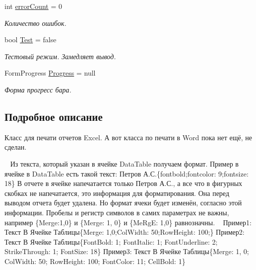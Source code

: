 \begin{DoxyCompactItemize}
int \mbox{\hyperlink{class_f_b_a_1_1_sys_report_x_l_s_x_a2a99d383eca41e9032454ca07cec6f4f}{error\+Count}} = 0
\begin{DoxyCompactList}\small\item\em Количество ошибок. \end{DoxyCompactList}\item 
bool \mbox{\hyperlink{class_f_b_a_1_1_sys_report_x_l_s_x_a738ec4b2907ead0a77b3c9ce3c212d1a}{Test}} = false
\begin{DoxyCompactList}\small\item\em Тестовый режим. Замедляет вывод. \end{DoxyCompactList}\item 
Form\+Progress \mbox{\hyperlink{class_f_b_a_1_1_sys_report_x_l_s_x_aaff45cfd52ba21dba901b47b7beb0ce7}{Progress}} = null
\begin{DoxyCompactList}\small\item\em Форма прогресс бара. \end{DoxyCompactList}\end{DoxyCompactItemize}


\subsection{Подробное описание}
Класс для печати отчетов Excel. А вот класса по печати в Word пока нет ещё, не сделан. 

~\newline
Из текста, который указан в ячейке Data\+Table получаем формат. Пример в ячейке в Data\+Table есть такой текст\+: Петров А.\+С.\{fontbold;fontcolor\+: 9;fontsize\+: 18\} В отчете в ячейке напечатается только Петров А.\+С., а все что в фигурных скобках не напечатается, это информация для форматирования. Она перед выводом отчета будет удалена. Но формат ячеки будет изменён, согласно этой информации. Пробелы и регистр символов в самих параметрах не важны, например \{Merge\+:1,0\} и \{Merge\+: 1, 0\} и \{Me\+RgE\+: 1,0\} равнозначны. ~\newline
Пример1\+: Текст В Ячейке Таблицы\{Merge\+: 1,0;Col\+Width\+: 50;Row\+Height\+: 100;\} Пример2\+: Текст В Ячейке Таблицы\{Font\+Bold\+: 1; Font\+Italic\+: 1; Font\+Underline\+: 2; Strike\+Through\+: 1; Font\+Size\+: 18\} Пример3\+: Текст В Ячейке Таблицы\{Merge\+: 1, 0; Col\+Width\+: 50; Row\+Height\+: 100; Font\+Color\+: 11; Cell\+Bold\+: 1\}

